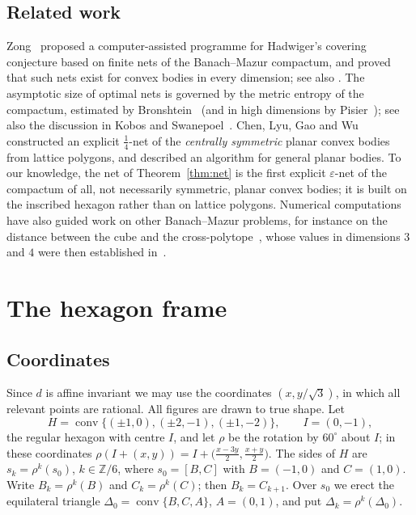 \documentclass[11pt]{amsart}
\theoremstyle{definition}
\theoremstyle{remark}
\DeclareMathOperator{\conv}{conv}
\newcommand{\dBM}{d}
\begin{document}
\subsection*{Related work}
Zong~\cite{Zong10} proposed a computer-assisted programme for Hadwiger's covering conjecture based on finite nets of
the Banach--Mazur compactum, and proved that such nets exist for convex bodies in every dimension; see also
\cite{GMWZ}. The asymptotic size of optimal nets is governed by the metric entropy of the compactum, estimated by
Bronshtein~\cite{Bronshtein} (and in high dimensions by Pisier~\cite{Pisier}); see also the discussion in
Kobos and Swanepoel~\cite{KS}. Chen, Lyu, Gao and Wu~\cite{CLGW} constructed an explicit $\frac14$-net of the
\emph{centrally symmetric} planar convex bodies from lattice polygons, and described an algorithm for general planar
bodies. To our knowledge, the net of Theorem~\ref{thm:net} is the first explicit $\varepsilon$-net of the compactum of
all, not necessarily symmetric, planar convex bodies; it is built on the inscribed hexagon rather than on lattice polygons.
Numerical computations have also guided work on other Banach--Mazur problems, for instance on the distance between
the cube and the cross-polytope~\cite{Xue}, whose values in dimensions $3$ and $4$ were then established in~\cite{KV}.

\section{The hexagon frame}\label{sec:frame}

\subsection{Coordinates}
Since $\dBM$ is affine invariant we may use the coordinates $(x,y/\sqrt3)$, in which all relevant points are
rational. All figures are drawn to true shape. Let
\[
  H=\conv\{(\pm1,0),(\pm2,-1),(\pm1,-2)\},\qquad I=(0,-1),
\]
the regular hexagon with centre $I$, and let $\rho$ be the rotation by $60^\circ$ about $I$; in these coordinates
$\rho(I+(x,y))=I+\bigl(\frac{x-3y}2,\frac{x+y}2\bigr)$. The sides of $H$ are $s_k=\rho^k(s_0)$, $k\in\mathbb Z/6$, where
$s_0=[B,C]$ with $B=(-1,0)$ and $C=(1,0)$. Write $B_k=\rho^k(B)$ and $C_k=\rho^k(C)$; then $B_k=C_{k+1}$. Over $s_0$ we
erect the equilateral triangle $\Delta_0=\conv\{B,C,A\}$, $A=(0,1)$, and put $\Delta_k=\rho^k(\Delta_0)$.
\end{document}
